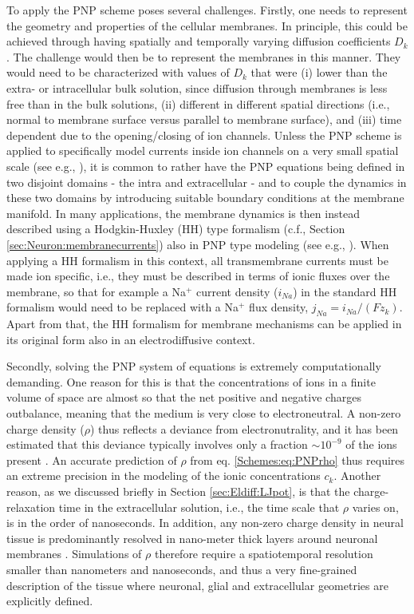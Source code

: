 To apply the PNP scheme poses several challenges. Firstly, one needs to represent the geometry and properties of the cellular membranes. In principle, this could be achieved through having spatially and temporally varying diffusion coefficients $D_k$. The challenge would then be to represent the membranes in this manner. They would need to be characterized with values of $D_k$ that were (i) lower than the extra- or intracellular bulk solution, since diffusion through membranes is less free than in the bulk solutions, (ii) different in different spatial directions (i.e., normal to membrane surface versus parallel to membrane surface), and (iii) time dependent due to the opening/closing of ion channels. Unless the PNP scheme is applied to specifically model currents inside ion channels on a very small spatial scale (see e.g., \citep{Gardner2011, Zheng2011}), it is common to rather have the PNP equations being defined in two disjoint domains - the intra and extracellular - and to couple the dynamics in these two domains by introducing suitable boundary conditions at the membrane manifold. In many applications, the membrane dynamics is then instead described using a Hodgkin-Huxley (HH) type formalism (c.f., Section \ref{sec:Neuron:membranecurrents}) also in PNP type modeling (see e.g., \citep{Lopreore2008, Pods2013, Gardner2015, Pods2017}). When applying a HH formalism in this context, all transmembrane currents must be made ion specific, i.e., they must be described in terms of ionic fluxes over the membrane, so that for example a Na$^+$ current density ($i_{Na}$) in the standard HH formalism would need to be replaced with a Na$^+$ flux density, $j_{Na} = i_{Na}/(Fz_k)$. Apart from that, the HH formalism for membrane mechanisms can be applied in its original form also in an electrodiffusive context.

Secondly, solving the PNP system of equations is extremely computationally demanding. One reason for this is that the concentrations of ions in a finite volume of space are almost so that the net positive and negative charges outbalance, meaning that the medium is very close to electroneutral. A non-zero charge density ($\rho$) thus reflects a deviance from electronutrality, and it has been estimated that this deviance typically involves only a fraction $\sim 10^{-9}$ of the ions present \citep{Aguilella1987}. An accurate prediction of $\rho$ from eq. \ref{Schemes:eq:PNPrho} thus requires an extreme precision in the modeling of the ionic concentrations $c_k$. Another reason, as we discussed briefly in Section \ref{sec:Eldiff:LJpot}, is that the charge-relaxation time in the extracellular solution, i.e., the time scale that $\rho$ varies on, is in the order of nanoseconds. In addition, any non-zero charge density in neural tissue is predominantly resolved in nano-meter thick layers around neuronal membranes \citep{Grodzinsky2011, Gratiy2017}. Simulations of $\rho$ therefore require a spatiotemporal resolution smaller than nanometers and nanoseconds, and thus a very fine-grained description of the tissue where neuronal, glial and extracellular geometries are explicitly defined.

